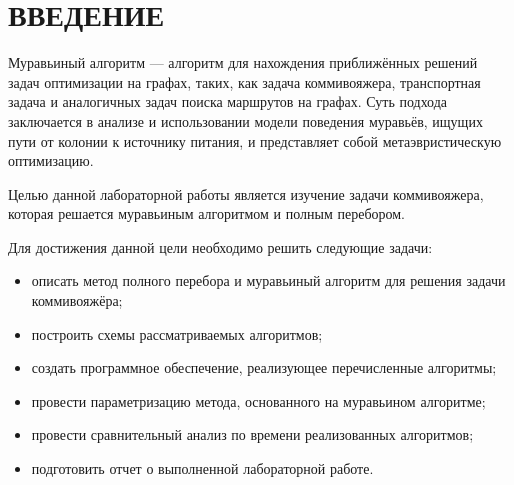 \chapter*{\hfill{\centering ВВЕДЕНИЕ}\hfill}
Муравьиный алгоритм — алгоритм для нахождения приближённых решений задач оптимизации на графах, таких, как задача коммивояжера, транспортная задача и аналогичных задач поиска маршрутов на графах.
Суть подхода заключается в анализе и использовании модели поведения муравьёв, ищущих пути от колонии к источнику питания, и представляет собой метаэвристическую оптимизацию.

Целью данной лабораторной работы является изучение задачи коммивояжера, которая решается муравьиным алгоритмом и полным перебором.

Для достижения данной цели необходимо решить следующие задачи:

\begin{itemize}
	\item описать метод полного перебора и муравьиный алгоритм для решения задачи коммивояжёра;
	\item построить схемы рассматриваемых алгоритмов;
	\item создать программное обеспечение, реализующее перечисленные алгоритмы;
	\item провести параметризацию метода, основанного на муравьином алгоритме;
	\item провести сравнительный анализ по времени реализованных алгоритмов;
	\item подготовить отчет о выполненной лабораторной работе.
\end{itemize}